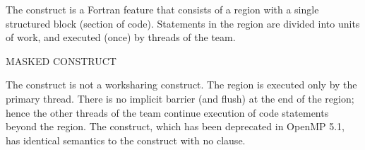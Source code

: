 The  construct is a Fortran feature that consists of a
region with a single structured block (section of code). Statements in the
 region are divided into units of work, and executed (once)
by threads of the team.  

\bigskip
MASKED CONSTRUCT

The  construct is not a worksharing construct.  The  region is
executed only by the primary thread. There is no implicit barrier (and flush) 
at the end of the  region; hence the other threads of the team continue
execution of code statements beyond the  region.
The  construct, which has been deprecated in OpenMP 5.1, has identical semantics
to the  construct with no  clause.





















